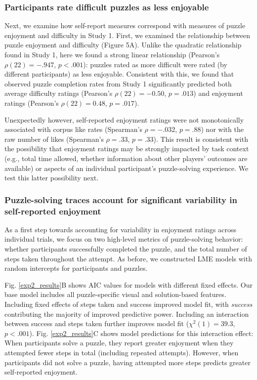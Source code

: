 \documentclass[10pt,letterpaper]{article}
\begin{document}
\subsubsection{Participants rate difficult puzzles as less enjoyable}

Next, we examine how self-report measures correspond with measures of puzzle enjoyment and difficulty in Study 1. First, we examined the relationship between puzzle enjoyment and difficulty (Figure 5A). Unlike the quadratic relationship found in Study 1, here we found a strong linear relationship (Pearson's $\rho(22)=-.947$, $p<.001$): puzzles rated as more difficult were rated (by different participants) as less enjoyable. Consistent with this, we found that observed puzzle completion rates from Study 1 significantly predicted both average difficulty ratings (Pearson's $\rho(22)=-0.50$, $p=.013$) and enjoyment ratings (Pearson's $\rho(22)=0.48$, $p = .017$). 

Unexpectedly however, self-reported enjoyment ratings were not monotonically associated with corpus like rates (Spearman's $\rho=-.032$, $p=.88$) nor with the raw number of likes (Spearman's $\rho=.33$, $p=.33$). This result is consistent with the possibility that enjoyment ratings may be strongly impacted by task context (e.g., total time allowed, whether information about other players' outcomes are available) or aspects of an individual participant's puzzle-solving experience. We test this latter possibility next.

\subsubsection{Puzzle-solving traces account for significant variability in self-reported enjoyment}
As a first step towards accounting for variability in enjoyment ratings across individual trials, we focus on two high-level metrics of puzzle-solving behavior: whether participants successfully completed the puzzle, and the total number of steps taken throughout the attempt. As before, we constructed LME models with random intercepts for participants and puzzles. 

Fig. \ref{exp2_results}B shows AIC values for models with different fixed effects. Our base model includes all puzzle-specific visual and solution-based features. Including fixed effects of steps taken and success improved model fit, with \textit{success} contributing the majority of improved predictive power. Including an interaction between success and steps taken further improves model fit ($\chi^2(1)=39.3$, $p < .001$). Fig. \ref{exp2_results}C shows model predictions for this interaction effect: 
When participants solve a puzzle, they report greater enjoyment when they attempted fewer steps in total (including repeated attempts). However, when participants did not solve a puzzle, having attempted more steps predicts greater self-reported enjoyment. 
\end{document}
